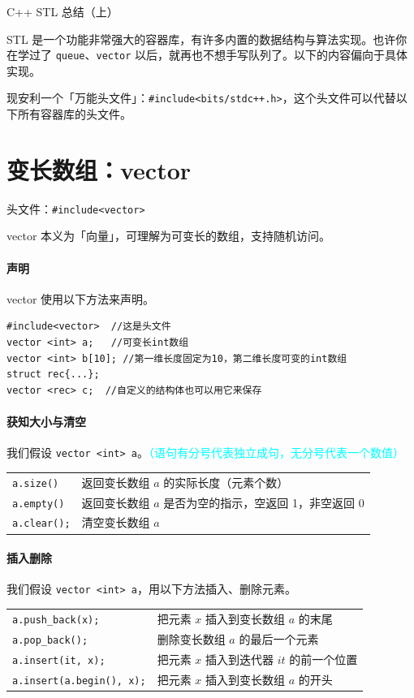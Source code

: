 \documentclass[UTF8]{ctexart}
\newcommand\Emph[1]{\colorbox{green!10}{\textcolor{green!30!black}{#1}}}
\begin{document}
{\color{cyan!50!black}
\begin{center}
    C++ STL 总结（上）
\end{center}
STL 是一个功能非常强大的容器库，有许多内置的数据结构与算法实现。也许你在学过了 \verb!queue!、\verb!vector! 以后，就再也不想手写队列了。以下的内容偏向于具体实现。
}

现安利一个「万能头文件」：\cprotect\Emph{\verb!#include<bits/stdc++.h>!}，这个头文件可以代替以下所有容器库的头文件。

\section{变长数组：vector}
头文件：\verb!#include<vector>!

vector 本义为「向量」，可理解为可变长的数组，支持随机访问。

\paragraph{声明}  vector 使用以下方法来声明。

\begin{lstlisting}[numbers=none]
#include<vector>  //这是头文件
vector <int> a;   //可变长int数组
vector <int> b[10]; //第一维长度固定为10，第二维长度可变的int数组
struct rec{...};
vector <rec> c;  //自定义的结构体也可以用它来保存
\end{lstlisting}

\paragraph{获知大小与清空} 我们假设 \verb!vector <int> a!。\textcolor{cyan}{（语句有分号代表独立成句，无分号代表一个数值）}
\begin{table}[H]
  \centering
  \begin{tabular}{ll}
  \verb!a.size()! & 返回变长数组 $a$ 的实际长度（元素个数） \\
  \verb!a.empty()! & 返回变长数组 $a$ 是否为空的指示，空返回 1，非空返回 0 \\
  \verb!a.clear();! & 清空变长数组 $a$ \\
  \end{tabular}
\end{table}

\paragraph{插入删除} 我们假设 \verb!vector <int> a!，用以下方法插入、删除元素。
\begin{table}[H]
  \centering
  \begin{tabular}{ll}
  \verb!a.push_back(x);! & 把元素 $x$ 插入到变长数组 $a$ 的末尾 \\
  \verb!a.pop_back();! & 删除变长数组 $a$ 的最后一个元素 \\
  \verb!a.insert(it, x);! & 把元素 $x$ 插入到迭代器 $it$ 的前一个位置 \\
  \verb!a.insert(a.begin(), x);! & 把元素 $x$ 插入到变长数组 $a$ 的开头 \\
  \end{tabular}
\end{table}
\end{document}
